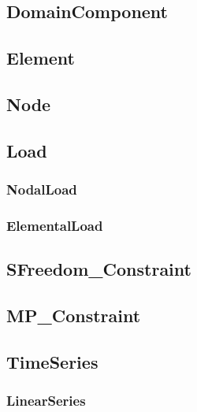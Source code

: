 
\subsection{{\bf DomainComponent}}


\pagebreak
\subsection{{\bf Element}}


\pagebreak
\subsection{Node}


\pagebreak
\subsection{{\bf Load}}


\pagebreak
\subsubsection{NodalLoad}


\pagebreak
\subsubsection{\bf ElementalLoad}


\pagebreak
\subsection{SFreedom\_Constraint}


\pagebreak
\subsection{MP\_Constraint}


\pagebreak
\subsection {\bf TimeSeries}


\pagebreak
\subsubsection {LinearSeries}


